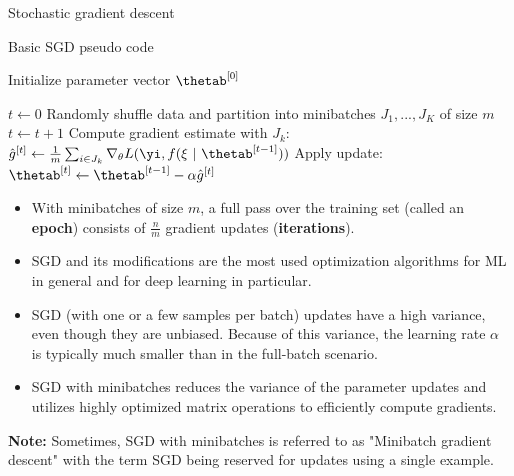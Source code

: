 \begin{vbframe}{Stochastic gradient descent}

  \begin{algorithm}[H]
  \footnotesize
    \caption{Basic SGD pseudo code}
    \begin{algorithmic}[1]
    \State Initialize parameter vector $\thetab^{[0]}$ 
    
    \State $t \leftarrow 0$
    \State Randomly shuffle data and partition into minibatches $J_1, ..., J_K$ of size $m$
      \State $t \leftarrow t + 1$ 
      \State Compute gradient estimate with $J_k$: $\hat{g}^{[t]} \leftarrow \frac{1}{m} \sum_{i \in J_k} \nabla_\theta L(\yi, f(\xi ~|~ \thetab^{[t-1]})) $
      \State Apply update: $\thetab^{[t]} \leftarrow \thetab^{[t-1]} - \alpha \hat{g}^{[t]}$
      
      \EndFor
    
        
      \EndWhile
    \end{algorithmic}
  \end{algorithm}
 
\framebreak

  \begin{itemize}
    \item With minibatches of size $m$, a full pass over the training set (called an \textbf{epoch}) consists of $\frac{n}{m}$ gradient updates (\textbf{iterations}).
    \item SGD and its modifications are the most used optimization algorithms for ML in general and for deep learning in particular.
    \item SGD (with one or a few samples per batch) updates have a high variance, even though they are unbiased. 
      Because of this variance, the learning rate $\alpha$ is typically much smaller than in the full-batch scenario.
    \item SGD with minibatches reduces the variance of the parameter updates and utilizes highly optimized matrix operations to efficiently compute gradients.
   \end{itemize}
\vspace*{0.5cm}
\textbf{Note:} Sometimes, SGD with minibatches is referred to as "Minibatch gradient descent" with the term SGD being reserved for updates using a single example.


\end{vbframe}
